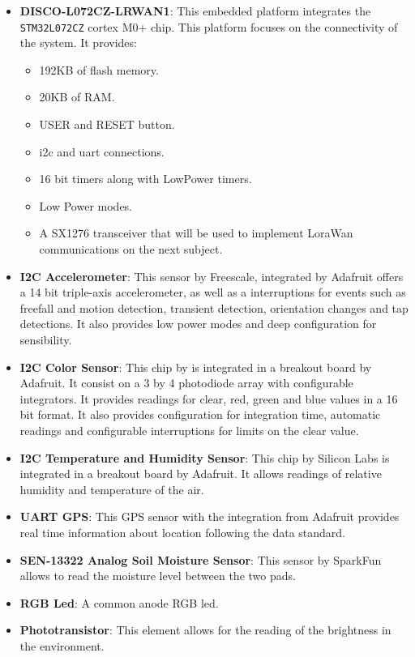 \begin{itemize}
    \item \textbf{DISCO-L072CZ-LRWAN1}\cite{DISCOL072CZLRWAN1Mbeda}: This embedded platform integrates the \texttt{STM32L072CZ}\cite{STM32L072CZUltralowpowerArm} cortex M0+ chip. This platform 
    focuses on the connectivity of the system. It provides:
    \begin{itemize}
        \item 192KB of flash memory.
        \item 20KB of RAM.
        \item USER and RESET button.
        \item \acrshort{i2c} and \acrshort{uart} connections.
        \item 16 bit timers along with LowPower timers.
        \item Low Power modes.
        \item A SX1276 transceiver that will be used to implement LoraWan communications on the next subject.
    \end{itemize}
    \item \textbf{I2C Accelerometer}\cite{MMA8451Q1a}: This sensor by Freescale, integrated by Adafruit\cite{DownloadsAdafruitMMA8451} offers 
    a 14 bit triple-axis accelerometer, as well as a  interruptions for events such as freefall and motion detection, transient detection, orientation changes and tap detections.\newline
    It also provides low power modes and deep configuration for sensibility.
    \item \textbf{I2C Color Sensor}\cite{TCS34725}: This chip by  is integrated in a breakout board by Adafruit\cite{RGBColorSensor}. It consist on a 3 by 4 photodiode array with configurable integrators. 
    \newline It provides readings for clear, red, green and blue values in a 16 bit format. It also provides configuration for integration time, automatic readings and configurable interruptions for limits on the clear value.
    \item \textbf{I2C Temperature and Humidity Sensor}\cite{Support_Documents_TechnicalDocs_Si7021A20}: This chip by Silicon Labs is integrated in a breakout board by Adafruit. It allows readings of relative humidity and temperature of the air.
    \item \textbf{UART GPS}\cite{GlobalTopFGPMMOPA6HDatasheetV0A}: This GPS sensor with the integration from Adafruit\cite{gpsDownloadsAda} provides real time information about location following the  data standard.
    \item \textbf{SEN-13322 Analog Soil Moisture Sensor}\cite{SparkFunSoilMoisture}: This sensor by SparkFun allows to read the moisture level between the two pads.
    \item \textbf{RGB Led}: A common anode RGB led.
    \item \textbf{Phototransistor}\cite{HW5P1_2015__1_}: This element allows for the reading of the brightness in the environment.
\end{itemize}
\clearpage
